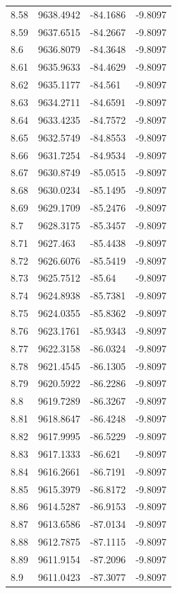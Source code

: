 \begin{table}[H]
\begin{tabular}{llll}
8.58 & 9638.4942 & -84.1686 & -9.8097 \\
8.59 & 9637.6515 & -84.2667 & -9.8097 \\
8.6 & 9636.8079 & -84.3648 & -9.8097 \\
8.61 & 9635.9633 & -84.4629 & -9.8097 \\
8.62 & 9635.1177 & -84.561 & -9.8097 \\
8.63 & 9634.2711 & -84.6591 & -9.8097 \\
8.64 & 9633.4235 & -84.7572 & -9.8097 \\
8.65 & 9632.5749 & -84.8553 & -9.8097 \\
8.66 & 9631.7254 & -84.9534 & -9.8097 \\
8.67 & 9630.8749 & -85.0515 & -9.8097 \\
8.68 & 9630.0234 & -85.1495 & -9.8097 \\
8.69 & 9629.1709 & -85.2476 & -9.8097 \\
8.7 & 9628.3175 & -85.3457 & -9.8097 \\
8.71 & 9627.463 & -85.4438 & -9.8097 \\
8.72 & 9626.6076 & -85.5419 & -9.8097 \\
8.73 & 9625.7512 & -85.64 & -9.8097 \\
8.74 & 9624.8938 & -85.7381 & -9.8097 \\
8.75 & 9624.0355 & -85.8362 & -9.8097 \\
8.76 & 9623.1761 & -85.9343 & -9.8097 \\
8.77 & 9622.3158 & -86.0324 & -9.8097 \\
8.78 & 9621.4545 & -86.1305 & -9.8097 \\
8.79 & 9620.5922 & -86.2286 & -9.8097 \\
8.8 & 9619.7289 & -86.3267 & -9.8097 \\
8.81 & 9618.8647 & -86.4248 & -9.8097 \\
8.82 & 9617.9995 & -86.5229 & -9.8097 \\
8.83 & 9617.1333 & -86.621 & -9.8097 \\
8.84 & 9616.2661 & -86.7191 & -9.8097 \\
8.85 & 9615.3979 & -86.8172 & -9.8097 \\
8.86 & 9614.5287 & -86.9153 & -9.8097 \\
8.87 & 9613.6586 & -87.0134 & -9.8097 \\
8.88 & 9612.7875 & -87.1115 & -9.8097 \\
8.89 & 9611.9154 & -87.2096 & -9.8097 \\
8.9 & 9611.0423 & -87.3077 & -9.8097 \\

\end{tabular}
\end{table}
